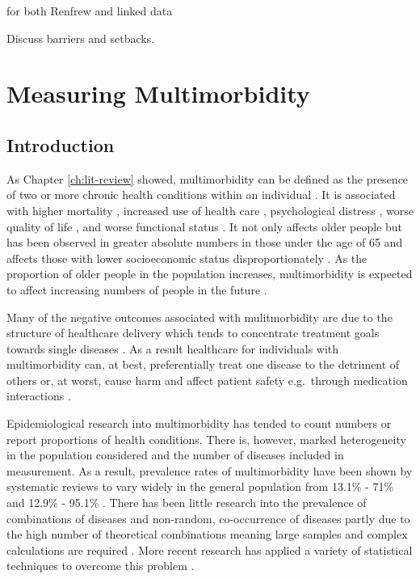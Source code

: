 \documentclass[12pt,]{report}
\begin{document}
for both Renfrew and linked data

Discuss barriers and setbacks.

\FloatBarrier
\newpage
{}

\chapter{Measuring Multimorbidity}\label{ch:clustering}

\section{Introduction}\label{sec:clust-intro}

As Chapter \ref{ch:lit-review} showed, multimorbidity can be defined as
the presence of two or more chronic health conditions within an
individual \citep{RN226}. It is associated with higher mortality
\citep{RN81}, increased use of health care \citep{RN81, RN22},
psychological distress \citep{RN243}, worse quality of life
\citep{RN241, RN242}, and worse functional status \citep{RN40}. It not
only affects older people but has been observed in greater absolute
numbers in those under the age of 65 and affects those with lower
socioeconomic status disproportionately \citep{RN33}. As the proportion
of older people in the population increases, multimorbidity is expected
to affect increasing numbers of people in the future
\citep{RN155, RN288}.

Many of the negative outcomes associated with mulitmorbidity are due to
the structure of healthcare delivery which tends to concentrate
treatment goals towards single diseases \citep[\citet{RN290}]{RN155}. As
a result healthcare for individuals with multimorbidity can, at best,
preferentially treat one disease to the detriment of others or, at
worst, cause harm and affect patient safety e.g.~through medication
interactions \citep{RN289}.

Epidemiological research into multimorbidity has tended to count numbers
or report proportions of health conditions. There is, however, marked
heterogeneity in the population considered and the number of diseases
included in measurement. As a result, prevalence rates of multimorbidity
have been shown by systematic reviews to vary widely in the general
population from 13.1\% - 71\% \citep{RN56} and 12.9\% - 95.1\%
\citep{RN15}. There has been little research into the prevalence of
combinations of diseases and non-random, co-occurrence of diseases
partly due to the high number of theoretical combinations meaning large
samples and complex calculations are required \citep{RN91, RN187}. More
recent research has applied a variety of statistical techniques to
overcome this problem \citep{RN98}.
\end{document}
